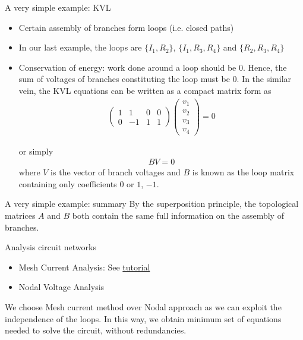 \documentclass[xcolor=dvipsnames]{beamer}
\begin{document}
\begin{frame}{A very simple example: KVL}
\begin{itemize}
	\item Certain assembly of branches form loops (i.e. closed paths)
	\item In our last example, the loops are $\{I_1, R_2\}$, $\{I_1, R_3, R_4\}$ and $\{R_2, R_3, R_4\}$
	\item Conservation of energy: work done around a loop should be 0. Hence, the sum of voltages of branches constituting the loop must be 0.
In the similar vein, the KVL equations can be written as a compact matrix form as
\begin{align*}
	\begin{pmatrix} 1 & 1 & 0 & 0\\ 0 & -1 & 1 & 1 \end{pmatrix}
	\begin{pmatrix} v_1\\ v_2 \\v_3 \\v_4  \end{pmatrix} =0
\end{align*}

or simply
\begin{align*}
	B V = 0
\end{align*}
where $V$ is the vector of branch voltages and $B$ is known as the {\color{purple}loop matrix} containing only coefficients $0$ or $1$, $-1$.
\end{itemize}
\end{frame}

\begin{frame}{A very simple example: summary}
	By the superposition principle, the topological matrices $A$ and $B$ both contain the same full information on the assembly of branches.
\end{frame}

\begin{frame}{Analysis circuit networks}
\begin{itemize}
	\item {\color{red}Mesh Current Analysis}: See  \href{https://www.electronics-tutorials.ws/dccircuits/dcp_5.html}{tutorial}
	\item Nodal Voltage Analysis
\end{itemize}
We choose Mesh current method over Nodal approach as we can exploit the independence of the loops.
In this way, we obtain minimum set of equations needed to solve the circuit, without redundancies.
\end{frame}
\end{document}

